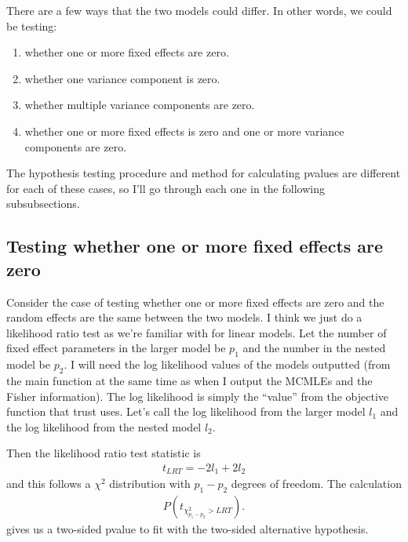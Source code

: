 \documentclass{article}
\begin{document}
 There are a few ways that the two models could differ. In other words, we could be testing:
 \begin{enumerate}
 \item whether one or more fixed effects are zero.
 \item whether one variance component is zero.
 \item whether multiple variance components are zero.
 \item whether one or more fixed effects is zero and one or more variance components are zero. 
\end{enumerate}
The hypothesis testing procedure and method for calculating pvalues are different for each of these cases, so I'll go through each one in the following subsubsections.

\subsection{Testing whether one or more fixed effects are zero}
Consider the  case of testing whether one or more fixed effects are zero and the random effects are the same between the two models. I think we just do a likelihood ratio test as we're familiar with for linear models.   Let the number of fixed effect parameters in the larger model be $p_1$  and the number in the nested model be $p_2$. I will need the log likelihood values of the models outputted (from the main function at the same time as when I output the MCMLEs and the Fisher information). The log likelihood is simply the ``value'' from the objective function that trust uses. Let's call the log likelihood from the larger model  $l_1$ and the log likelihood from the nested model  $l_2$. 

Then the likelihood ratio test statistic is
\begin{align}
t_{LRT}= -2l_1+2l_2
\end{align}
and this follows a $\chi^2$ distribution with $p_1-p_2$ degrees of freedom. The calculation
\begin{align}
P(t_{\chi^2_{p_1-p_2}>LRT} ).
\end{align}
gives us a two-sided pvalue to fit with the two-sided alternative hypothesis.

 
\end{document}
